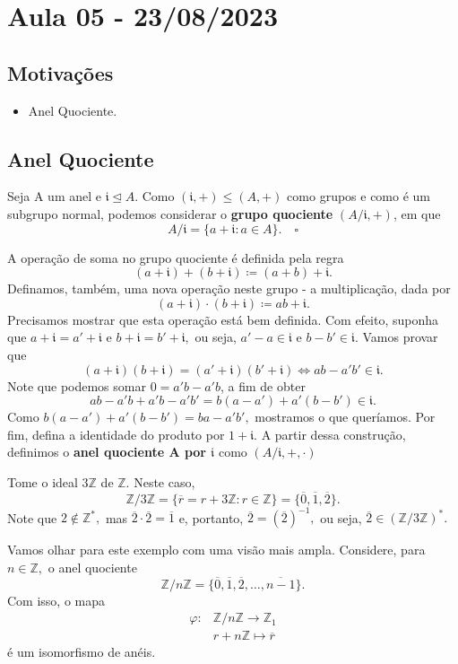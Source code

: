 \documentclass[AlgebraII/algebraII_notes.tex]{subfiles}
\begin{document}
\section{Aula 05 - 23/08/2023}
\subsection{Motivações}
\begin{itemize}
	\item Anel Quociente.
\end{itemize}
\subsection{Anel Quociente}
\begin{def*}
	Seja A um anel e \(\mathfrak{i}\trianglelefteq{A}.\) Como \((\mathfrak{i}, +)\leq (A, +)\) como grupos e
	como é um subgrupo normal, podemos considerar o \textbf{grupo quociente} \((A/\mathfrak{i}, +)\), em que
	\[
		A/\mathfrak{i} = \{a + \mathfrak{i}: a \in A\}.\quad\square
	\]
\end{def*}
A operação de soma no grupo quociente é definida pela regra
\[
	(a+\mathfrak{i})+(b+\mathfrak{i})\coloneqq (a+b)+\mathfrak{i}.
\]
Definamos, também, uma nova operação neste grupo - a multiplicação, dada por
\[
	(a+\mathfrak{i})\cdot (b+\mathfrak{i})\coloneqq ab + \mathfrak{i}.
\]
Precisamos mostrar que esta operação está bem definida. Com efeito, suponha que
\(a+\mathfrak{i} = a'+\mathfrak{i}\) e \(b+\mathfrak{i} = b'+\mathfrak{i},\) ou seja,
\(a'-a\in \mathfrak{i}\) e \(b-b'\in \mathfrak{i}.\) Vamos provar que
\[
	(a+\mathfrak{i})(b+\mathfrak{i}) = (a'+\mathfrak{i})(b'+\mathfrak{i}) \Longleftrightarrow ab - a'b'\in \mathfrak{i}.
\]
Note que podemos somar \(0=a'b-a'b\), a fim de obter
\[
	ab - a'b + a'b - a'b' = b(a-a') + a'(b-b')\in \mathfrak{i}.
\]
Como \(b(a-a') + a'(b-b') = ba - a'b',\) mostramos o que queríamos. Por fim,
defina a identidade do produto por \(1 + \mathfrak{i}.\) A partir dessa construção,
definimos o \textbf{anel quociente A por \(\mathfrak{i}\)} como \((A/\mathfrak{i}, +, \cdot )\)
\begin{example}
	Tome o ideal \(3 \mathbb{Z}\) de \(\mathbb{Z}.\) Neste caso,
	\[
		\mathbb{Z}/3 \mathbb{Z} = \{\overline{r} = r + 3 \mathbb{Z}:r\in \mathbb{Z}\} = \{\overline{0}, \overline{1}, \overline{2}\}.
	\]
	Note que \(2\not\in \mathbb{Z}^{*},\) mas \(\overline{2}\cdot \overline{2} = \overline{1}\) e, portanto, \(\overline{2} = (\overline{2})^{-1},\) ou seja,
	\(\overline{2}\in (\mathbb{Z}/3 \mathbb{Z})^{*}.\)

	Vamos olhar para este exemplo com uma visão mais ampla. Considere, para \(n\in \mathbb{Z},\) o anel quociente
	\[
		\mathbb{Z}/n \mathbb{Z} = \{\overline{0}, \overline{1}, \overline{2}, \dotsc , \overline{n-1}\}.
	\]
	Com isso, o mapa
	\begin{align*}
		\varphi : & \mathbb{Z}/n \mathbb{Z}\rightarrow \mathbb{Z}_{1} \\
		          & r + n\mathbb{Z}\mapsto \overline{r}
	\end{align*}
	é um isomorfismo de anéis.
\end{example}
\end{document}
